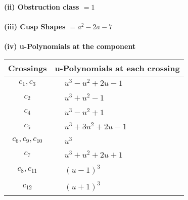 \documentclass[1p]{elsarticle_modified}
\theoremstyle{definition}
\begin{document}
\flushleft \textbf{(ii) Obstruction class $= 1$}\\~\\
\flushleft \textbf{(iii) Cusp Shapes $= a^2-2 a-7$}\\~\\
\newpage\renewcommand{\arraystretch}{1}
\flushleft \textbf{(iv) u-Polynomials at the component}\newline \\
\begin{tabular}{m{50pt}|m{274pt}}
Crossings & \hspace{64pt}u-Polynomials at each crossing \\
\hline $$\begin{aligned}c_{1},c_{3}\end{aligned}$$&$\begin{aligned}
&u^3- u^2+2 u-1
\end{aligned}$\\
\hline $$\begin{aligned}c_{2}\end{aligned}$$&$\begin{aligned}
&u^3+u^2-1
\end{aligned}$\\
\hline $$\begin{aligned}c_{4}\end{aligned}$$&$\begin{aligned}
&u^3- u^2+1
\end{aligned}$\\
\hline $$\begin{aligned}c_{5}\end{aligned}$$&$\begin{aligned}
&u^3+3 u^2+2 u-1
\end{aligned}$\\
\hline $$\begin{aligned}c_{6},c_{9},c_{10}\end{aligned}$$&$\begin{aligned}
&u^3
\end{aligned}$\\
\hline $$\begin{aligned}c_{7}\end{aligned}$$&$\begin{aligned}
&u^3+u^2+2 u+1
\end{aligned}$\\
\hline $$\begin{aligned}c_{8},c_{11}\end{aligned}$$&$\begin{aligned}
&(u-1)^3
\end{aligned}$\\
\hline $$\begin{aligned}c_{12}\end{aligned}$$&$\begin{aligned}
&(u+1)^3
\end{aligned}$\\
\hline
\end{tabular}\\~\\
\end{document}
